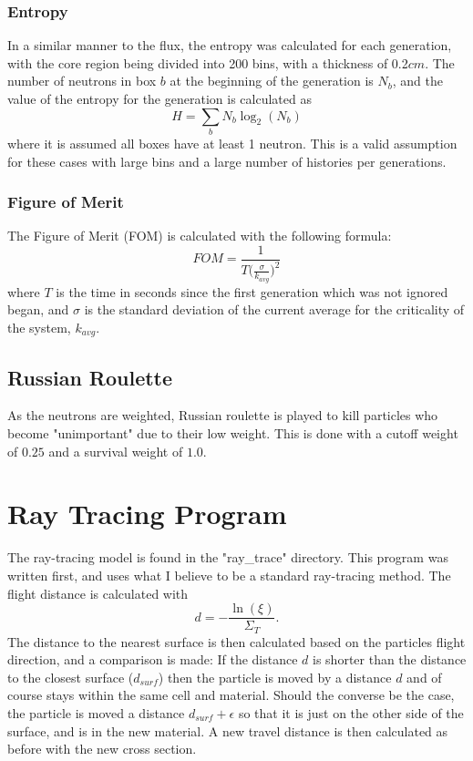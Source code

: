 \documentclass{article}
\begin{document}
			\subsubsection{Entropy}
			In a similar manner to the flux, the entropy was calculated for each generation, with the core region being divided into 200 bins, with a thickness of 0.2$cm$. The number of neutrons in box $b$ at the beginning of the generation is $N_b$, and the value of the entropy for the generation is calculated as
			\begin{equation}
				H = \sum_{b} N_b \log_2(N_b)
			\end{equation}
			where it is assumed all boxes have at least 1 neutron. This is a valid assumption for these cases with large bins and a large number of histories per generations.
			
			\subsubsection{Figure of Merit}
			The Figure of Merit (FOM) is calculated with the following formula:
			\begin{equation}
				FOM = \frac{1}{T\big(\frac{\sigma}{k_{avg}}\big)^2}
			\end{equation}
			where $T$ is the time in seconds since the first generation which was not ignored began, and $\sigma$ is the standard deviation of the current average for the criticality of the system, $k_{avg}$.
			
	\subsection{Russian Roulette}
	As the neutrons are weighted, Russian roulette is played to kill particles who become "unimportant" due to their low weight. This is done with a cutoff weight of $0.25$ and a survival weight of $1.0$.
	
	\section{Ray Tracing Program}
	The ray-tracing model is found in the "ray\_trace" directory. This program was written first, and uses what I believe to be a standard ray-tracing method. The flight distance is calculated with
	\begin{equation}
		d = -\frac{\ln(\xi)}{\Sigma_T}.
	\end{equation}
	The distance to the nearest surface is then calculated based on the particles flight direction, and a comparison is made: If the distance $d$ is shorter than the distance to the closest surface ($d_{surf}$) then the particle is moved by a distance $d$ and of course stays within the same cell and material. Should the converse be the case, the particle is moved a distance $d_{surf} + \epsilon$ so that it is just on the other side of the surface, and is in the new material. A new travel distance is then calculated as before with the new cross section.
	
\end{document}
